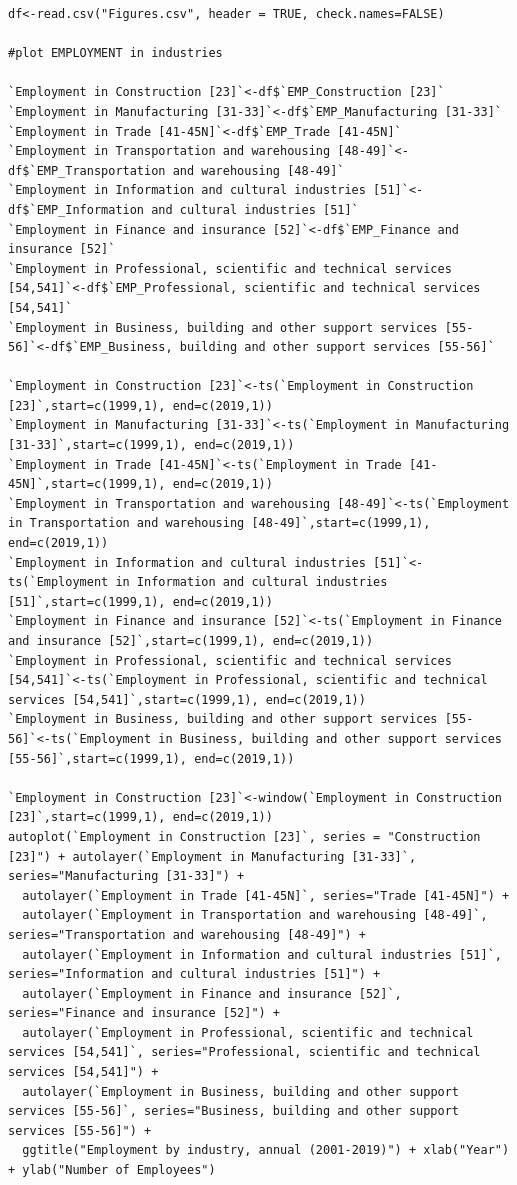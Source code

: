 \documentclass[12pt]{article}
\begin{document}
\begin{verbatim}
df<-read.csv("Figures.csv", header = TRUE, check.names=FALSE)

#plot EMPLOYMENT in industries

`Employment in Construction [23]`<-df$`EMP_Construction [23]`
`Employment in Manufacturing [31-33]`<-df$`EMP_Manufacturing [31-33]`
`Employment in Trade [41-45N]`<-df$`EMP_Trade [41-45N]`
`Employment in Transportation and warehousing [48-49]`<-df$`EMP_Transportation and warehousing [48-49]`
`Employment in Information and cultural industries [51]`<-df$`EMP_Information and cultural industries [51]`
`Employment in Finance and insurance [52]`<-df$`EMP_Finance and insurance [52]`
`Employment in Professional, scientific and technical services [54,541]`<-df$`EMP_Professional, scientific and technical services [54,541]`
`Employment in Business, building and other support services [55-56]`<-df$`EMP_Business, building and other support services [55-56]`	

`Employment in Construction [23]`<-ts(`Employment in Construction [23]`,start=c(1999,1), end=c(2019,1))
`Employment in Manufacturing [31-33]`<-ts(`Employment in Manufacturing [31-33]`,start=c(1999,1), end=c(2019,1))
`Employment in Trade [41-45N]`<-ts(`Employment in Trade [41-45N]`,start=c(1999,1), end=c(2019,1))
`Employment in Transportation and warehousing [48-49]`<-ts(`Employment in Transportation and warehousing [48-49]`,start=c(1999,1), end=c(2019,1))
`Employment in Information and cultural industries [51]`<-ts(`Employment in Information and cultural industries [51]`,start=c(1999,1), end=c(2019,1))
`Employment in Finance and insurance [52]`<-ts(`Employment in Finance and insurance [52]`,start=c(1999,1), end=c(2019,1))
`Employment in Professional, scientific and technical services [54,541]`<-ts(`Employment in Professional, scientific and technical services [54,541]`,start=c(1999,1), end=c(2019,1))
`Employment in Business, building and other support services [55-56]`<-ts(`Employment in Business, building and other support services [55-56]`,start=c(1999,1), end=c(2019,1))

`Employment in Construction [23]`<-window(`Employment in Construction [23]`,start=c(1999,1), end=c(2019,1)) 
autoplot(`Employment in Construction [23]`, series = "Construction [23]") + autolayer(`Employment in Manufacturing [31-33]`, series="Manufacturing [31-33]") +
  autolayer(`Employment in Trade [41-45N]`, series="Trade [41-45N]") +
  autolayer(`Employment in Transportation and warehousing [48-49]`, series="Transportation and warehousing [48-49]") +
  autolayer(`Employment in Information and cultural industries [51]`, series="Information and cultural industries [51]") +
  autolayer(`Employment in Finance and insurance [52]`, series="Finance and insurance [52]") +
  autolayer(`Employment in Professional, scientific and technical services [54,541]`, series="Professional, scientific and technical services [54,541]") +
  autolayer(`Employment in Business, building and other support services [55-56]`, series="Business, building and other support services [55-56]") +
  ggtitle("Employment by industry, annual (2001-2019)") + xlab("Year") + ylab("Number of Employees")


\end{verbatim}
\end{document}
